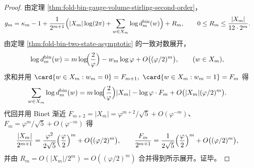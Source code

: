 \begin{proof}
由定理 \ref{thm:fold-bin-gauge-volume-stirling-second-order}，
\[
g_m=\kappa_m-1+\frac{1}{2^{m+1}}\Bigl(|X_m|\log(2\pi)+\sum_{w\in X_m}\log d^{\mathrm{bin}}_m(w)\Bigr)+R_m,
\qquad 0\le R_m\le \frac{|X_m|}{12\cdot 2^m}.
\]
由定理 \ref{thm:fold-bin-two-state-asymptotic} 的一致对数展开，
\[
\log d^{\mathrm{bin}}_m(w)=m\log\!\Bigl(\frac{2}{\varphi}\Bigr)-w_m\log\varphi+O\bigl((\varphi/2)^m\bigr),
\qquad (w\in X_m),
\]
求和并用
\(
\card\{w\in X_m:w_m=0\}=F_{m+1},\ \card\{w\in X_m:w_m=1\}=F_m
\)
得
\[
\sum_{w\in X_m}\log d^{\mathrm{bin}}_m(w)
=m\log\!\Bigl(\frac{2}{\varphi}\Bigr)|X_m|-\log\varphi\cdot F_m+O\bigl(|X_m|(\varphi/2)^m\bigr).
\]
代回并用 Binet 渐近 \(F_{m+2}=|X_m|=\varphi^{m+2}/\sqrt5+O(\varphi^{-m})\)、\(F_m=\varphi^m/\sqrt5+O(\varphi^{-m})\) 得
\[
\frac{|X_m|}{2^{m+1}}
=\frac{\varphi^2}{2\sqrt5}\Bigl(\frac{\varphi}{2}\Bigr)^m+O\bigl((\varphi/2)^m\bigr),
\qquad
\frac{F_m}{2^{m+1}}
=\frac{1}{2\sqrt5}\Bigl(\frac{\varphi}{2}\Bigr)^m+O\bigl((\varphi/2)^m\bigr),
\]
并由 \(R_m=O(|X_m|/2^m)=O((\varphi/2)^m)\) 合并得到所示展开。证毕。
\end{proof}

